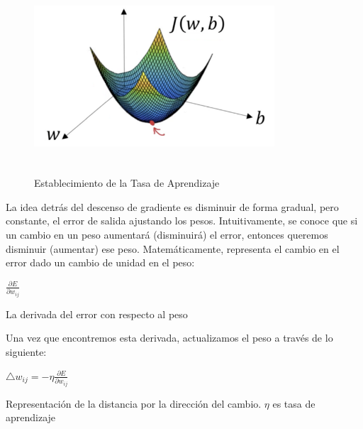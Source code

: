 		\begin{figure}[H]
		\begin{center}
		\includegraphics[width=0.8\textwidth,height=6.5cm]{images/desarrollo/entrenamiento/gradient}
		\end{center}
		\begin{center}
		\caption{\small{Establecimiento de la Tasa de Aprendizaje}}
		\vspace{-0.5em}
		{\small{\cite{gradientimg}}}
		\end{center}
		\vspace{-1.5em}
		\end{figure}
		

		La idea detrás del descenso de gradiente es disminuir de forma gradual, pero constante, el error de salida ajustando los pesos. Intuitivamente, se conoce que si un cambio en un peso aumentará (disminuirá) el error, entonces queremos disminuir (aumentar) ese peso. Matemáticamente, representa el cambio en el error dado un cambio de unidad en el peso:

		\begingroup\makeatletter{}\check@mathfonts
		\begin{center}
		$ \frac{{\partial E}}{\partial w_{ij}}$
		\end{center}
		\begin{center}
		{\small{La derivada del error con respecto al peso}}
		\end{center}
		\endgroup
		
		Una vez que encontremos esta derivada, actualizamos el peso a través de lo siguiente:

		\begingroup\makeatletter{}\check@mathfonts
		\begin{center}
		$  \triangle w_{ij} = -\eta\frac{{\partial E}}{\partial w_{ij}} $
		\end{center}
		\begin{center}
		{\small{Representación de la distancia por la dirección del cambio. $\eta$  es tasa de aprendizaje}}
		\end{center}
		\endgroup

